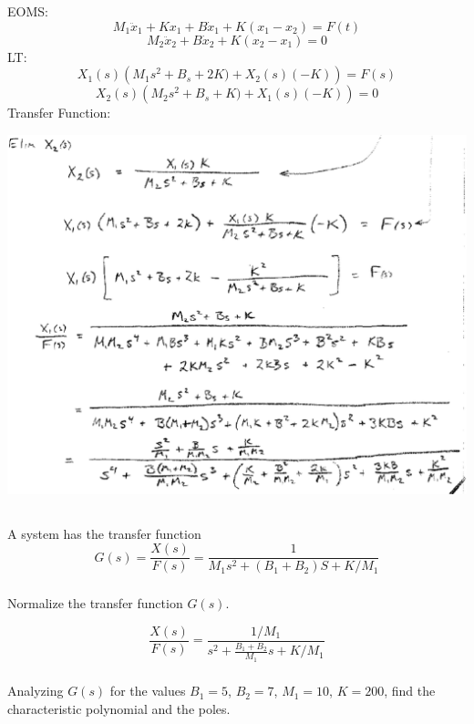 \documentclass{article}	%
\begin{document}
\begin{solution}
EOMS:
\[
M_1\ddot{x}_1+Kx_1+B\dot{x}_1+K(x_1-x_2) = F(t)
\]
\[
M_2\ddot{x}_2+B\dot{x}_2+K(x_2-x_1) = 0
\]
LT:
\[
X_1(s)\left( M_1s^2+B_s+2K) + X_2(s)(-K)  \right ) = F(s)
\]
\[
X_2(s)\left( M_2s^2+B_s+K) + X_1(s)(-K)  \right ) = 0
\]
Transfer Function:

\includegraphics[width=6.25in]{00943a.png}

\end{solution}


\subsection{}
 A system has the transfer function
\[
G(s) =  \frac{X(s)}{F(s)} = \frac{1}{M_1s^2+(B_1+B_2)S + K/M_1}
\]

\subsubsection{}
Normalize the transfer function $G(s)$.

\begin{solution}
\[
\frac{X(s)}{F(s)} = \frac{1/M_1} {s^2+\frac{B_1+B_2}{M_1}s + K/M_1}
\]
\end{solution}

\subsubsection{}
 Analyzing $G(s)$ for the values $B_1=5$, $B_2 = 7$, $M_1 = 10$, $K=200$,
 find the characteristic polynomial and the poles.
\end{document}
